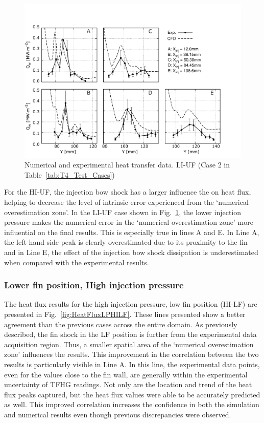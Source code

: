 \documentclass{AIAA}
\begin{document}
\begin{figure}[!h]
\center
\includegraphics[trim = 0mm 3mm 25mm 25mm, clip, width=0.60\columnwidth,valign=t,fbox]{Figures/Data/LP_LI_UF/GNUP_CFD_GaugesLines_Multi.pdf}
\caption{Numerical and experimental heat transfer data. LI-UF (Case 2 in Table~\ref{tab:T4_Test_Cases})}
\label{fig:HeatFluxLPLIUF}
\end{figure} 
%


For the HI-UF, the injection bow shock has a larger influence the on heat flux, helping to decrease the level of intrinsic error experienced from the `numerical overestimation zone'.
In the LI-UF case shown in Fig.~\ref{fig:HeatFluxLPLIUF}, the lower injection pressure makes the numerical error in the `numerical overestimation zone' more influential on the final results.
This is especially true in lines A and E.
In Line A, the left hand side peak is clearly overestimated due to its proximity to the fin and in Line E, the effect of the injection bow shock dissipation is underestimated when compared with the experimental results.

\subsubsection{Lower fin position, High injection pressure}

The heat flux results for the high injection pressure, low fin position (HI-LF) are presented in Fig.~\ref{fig:HeatFluxLPHILF}.
These lines presented show a better agreement than the previous cases across the entire domain.
As previously described, the fin shock in the LF position is further from the experimental data acquisition region.
Thus, a smaller spatial area of the `numerical overestimation zone' influences the results. 
This improvement in the correlation between the two results is particularly visible in Line A.
In this line, the experimental data points, even for the values close to the fin wall, are generally within the experimental uncertainty of TFHG readings.
Not only are the location and trend of the heat flux peaks captured, but the heat flux values were able to be accurately predicted as well. 
This improved correlation increases the confidence in both the simulation and numerical results even though previous discrepancies were observed. 
\end{document}

